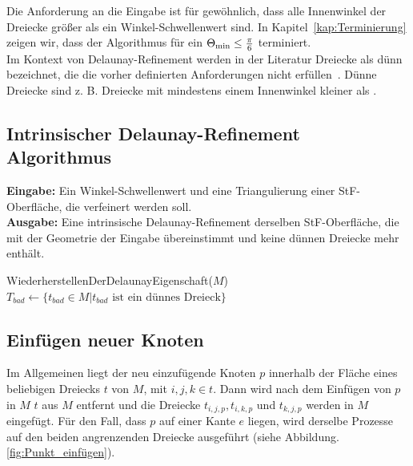 Die Anforderung an die Eingabe ist für gewöhnlich,
dass alle Innenwinkel der Dreiecke größer als ein Winkel-Schwellenwert \kleinsterWinkel sind.
In Kapitel~\ref{kap:Terminierung} zeigen wir, dass der Algorithmus für ein $\kleinsterWinkel* \leq \frac{\pi}{6} $  terminiert.\\
Im Kontext von Delaunay-Refinement werden in der Literatur  Dreiecke als dünn bezeichnet, die die vorher definierten Anforderungen nicht erfüllen~\cite{shewchuk:1997:delaunay}. 
Dünne Dreiecke sind z. B. Dreiecke mit mindestens einem Innenwinkel kleiner als \kleinsterWinkel. 

\subsection*{Intrinsischer Delaunay-Refinement Algorithmus}
\textbf{Eingabe:}
Ein Winkel-Schwellenwert \kleinsterWinkel und eine Triangulierung einer StF-Oberfläche, die verfeinert werden soll.  \\

\textbf{Ausgabe:}
Eine intrinsische Delaunay-Refinement derselben StF-Oberfläche, die mit der Geometrie der Eingabe übereinstimmt und keine dünnen Dreiecke mehr enthält.\\

\begin{algorithm}[H]
\label{alg:1}
\SetAlgoLined
{}
  WiederherstellenDerDelaunayEigenschaft($M$)\;
 $T_{bad} \gets  \{t_{bad} \in M | t_{bad}  \text{ ist ein dünnes Dreieck}\}$ \;
 \caption{\algorithmusname}
\end{algorithm}


\subsection*{Einfügen neuer Knoten}
Im Allgemeinen liegt der neu einzufügende Knoten $p$ innerhalb der Fläche eines beliebigen Dreiecks  $t$  von $M$, mit $i,j,k \in t$. Dann wird nach dem Einfügen von $p$ in $M$ $t$ aus $M$ entfernt und die Dreiecke $t_{i,j,p}, t_{i,k,p}$ und $t_{k,j,p}$ werden  in $M$ eingefügt. 
Für den Fall, dass $p$ auf einer Kante $e$ liegen, wird derselbe Prozesse auf den beiden angrenzenden Dreiecke ausgeführt (siehe Abbildung. \ref{fig:Punkt_einfügen}).  

